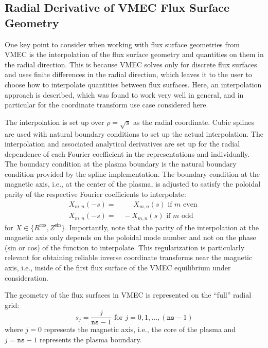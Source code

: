 \FloatBarrier
\subsection{Radial Derivative of VMEC Flux Surface Geometry}
%
One key point to consider when working with flux surface geometries from VMEC
is the interpolation of the flux surface geometry and quantities on them
in the radial direction.
%
This is because VMEC solves only for discrete flux surfaces
and uses finite differences in the radial direction,
which leaves it to the user to choose how to interpolate quantities between flux surfaces.
%
Here, an interpolation approach is described, which was found to work very well in general,
and in particular for the coordinate transform use case considered here.

The interpolation is set up over $\rho = \sqrt{s}$ as the radial coordinate.
%
Cubic splines are used with natural boundary conditions to set up the actual interpolation.
%
The interpolation and associated analytical derivatives are set up
for the radial dependence of each Fourier coefficient in the representations
 and  individually.
%
The boundary condition at the plasma boundary is the natural boundary condition provided by the spline implementation.
%
The boundary condition at the magnetic axis, i.e., at the center of the plasma,
is adjusted to satisfy the poloidal parity of the respective Fourier coefficients to interpolate:
\begin{align}
 X_{m, n}(-s) =&\, \phantom{-} ~ X_{m, n}(s) \textrm{ if } m \textrm{ even } \\
 X_{m, n}(-s) =&\,          -    X_{m, n}(s) \textrm{ if } m \textrm{ odd }
\end{align}
for $X \in \{ R^\textrm{cos}, Z^\textrm{sin} \}$.
%
Importantly, note that the parity of the interpolation at the magnetic axis
only depends on the poloidal mode number and not on the phase (sin or cos)
of the function to interpolate.
%
This regularization is particularly relevant for obtaining reliable
inverse coordinate transforms near the magnetic axis, i.e.,
inside of the first flux surface of the VMEC equilibrium under consideration.

The geometry of the flux surfaces in VMEC is represented on the ``full'' radial grid:
\begin{equation}
 s_j = \frac{j}{\texttt{ns} - 1} \textrm{ for } j = 0, 1, ..., (\texttt{ns} - 1)
\end{equation}
where $j=0$ represents the magnetic axis, i.e., the core of the plasma
and $j=\texttt{ns} - 1$ represents the plasma boundary.

